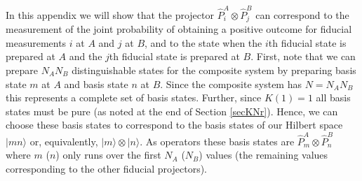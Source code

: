 \documentclass[12pt]{article}
\begin{document}
\vspace{6mm}


\vspace{6mm}

In this appendix we will show that the projector
$\hat{P}^A_i\otimes\hat{P}^B_j$ can correspond to the measurement of the joint
probability of obtaining a positive outcome for fiducial measurements
$i$ at $A$ and $j$ at $B$, and to the state when the $i$th fiducial
state is prepared at $A$ and the $j$th fiducial state is prepared at
$B$. First, note that we can prepare $N_AN_B$ distinguishable states
for the composite system by preparing basis state $m$ at $A$ and basis
state $n$ at $B$.  Since the composite system has $N=N_AN_B$ this
represents a complete set of basis states.  Further, since $K(1)=1$ all
basis states must be pure (as noted at the end of Section \ref{secKNr}).
Hence, we can choose these basis states to correspond to the basis states of
our Hilbert space $|mn\rangle$ or, equivalently,
$|m\rangle\otimes|n\rangle$.  As operators these basis states are
$\hat{P}^A_m\otimes\hat{P}^B_n$ where $m$ ($n$) only runs over the first
$N_A$ ($N_B$) values (the remaining values corresponding to the other
fiducial projectors).
\end{document}
